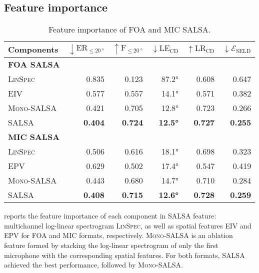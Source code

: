 \documentclass[journal]{IEEEtran}
\begin{document}
\subsection{Feature importance}

\begin{table}[t]
    \centering
    \setlength\tabcolsep{3pt}
    \caption{Feature importance of FOA and MIC SALSA.}
    \noindent\begin{tabularx}{\columnwidth}{Xrrrrr}
    \toprule 
        Components
        & $\downarrow \text{ER}_{\le \SI{20}{\degree}}$ 
        & $\uparrow \text{F}_{\le \SI{20}{\degree}}$
        & $\downarrow \text{LE}_\text{CD}$
        & $\uparrow \text{LR}_\text{CD}$ 
        & $\downarrow \mathcal{E}_\text{SELD}$ \\
    \midrule
    \bfseries FOA SALSA\\
    
        \textsc{LinSpec}            & 0.835 & 0.123 & 87.2\si{\degree} & 0.608 & 0.647 \\
        EIV           & 0.577 & 0.557 & 14.1\si{\degree} & 0.571 & 0.382 \\
        \textsc{Mono-SALSA}             & 0.421 & 0.705 & 12.8\si{\degree} & 0.723 & 0.266 \\
        SALSA              & \bf{0.404} & \bf{0.724} & \bf{12.5\si{\degree}} & \bf{0.727} & \bf{0.255} \\
    \midrule
    \bfseries MIC SALSA\\
    
        \textsc{LinSpec}            & 0.506 & 0.616 & 18.1\si{\degree} & 0.698 & 0.323 \\
        EPV           & 0.629 & 0.502 & 17.4\si{\degree} & 0.547 & 0.419 \\
        \textsc{Mono-SALSA}             & 0.443 & 0.680 & 14.7\si{\degree} & 0.710 & 0.284 \\
        SALSA              & \bf{0.408} & \bf{0.715} & \bf{12.6\si{\degree}} & \bf{0.728} & \bf{0.259} \\
    \bottomrule
    \end{tabularx}
    \label{tab:salsa_foa_feature_imp}
    \label{tab:salsa_mic_feature_imp}
\end{table}


 reports the feature importance of each component in SALSA feature: multichannel log-linear spectrogram \textsc{LinSpec}, as well as spatial features EIV and EPV for FOA and MIC formats, respectively. \textsc{Mono-SALSA} is an ablation feature formed by stacking the log-linear spectrogram of only the first microphone with the corresponding spatial features.
For both formats, SALSA achieved the best performance, followed by \textsc{Mono-SALSA}. 
\end{document}
